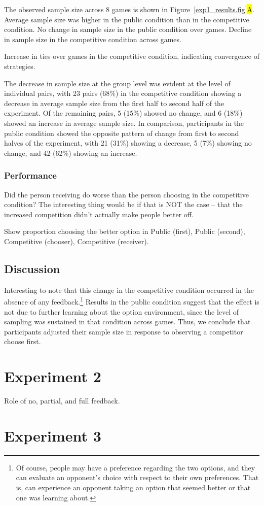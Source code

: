 \documentclass[11pt,jou]{apa6}
\begin{document}
The observed sample size across 8 games is shown in Figure~\ref{exp1_results.fig}\hl{A}.
Average sample size was higher in the public condition than in the competitive condition.
No change in sample size in the public condition over games. Decline in sample size in the competitive condition across games.

Increase in ties over games in the competitive condition, indicating convergence of strategies.

The decrease in sample size at the group level was evident at the level of individual pairs, with 23 pairs (68\%) in the competitive condition showing a decrease in average sample size from the first half to second half of the experiment. Of the remaining pairs, 5 (15\%) showed no change, and 6 (18\%) showed an increase in average sample size.
In comparison, participants in the public condition showed the opposite pattern of change from first to second halves of the experiment, with 21 (31\%) showing a decrease, 5 (7\%) showing no change, and 42 (62\%) showing an increase.


\subsubsection{Performance}

Did the person receiving do worse than the person choosing in the competitive condition? The interesting thing would be if that is NOT the case -- that the increased competition didn't actually make people better off.

Show proportion choosing the better option in Public (first), Public (second), Competitive (chooser), Competitive (receiver).

\subsection{Discussion}

Interesting to note that this change in the competitive condition occurred in the absence of any feedback.\footnote{Of course, people may have a preference regarding the two options, and they can evaluate an opponent's choice with respect to their own preferences. That is, can experience an opponent taking an option that seemed better or that one was learning about.}
Results in the public condition suggest that the effect is not due to further learning about the option environment, since the level of sampling was sustained in that condition across games.
Thus, we conclude that participants adjusted their sample size in response to observing a competitor choose first.


\section{Experiment 2}

Role of no, partial, and full feedback.



\section{Experiment 3}




\end{document}
